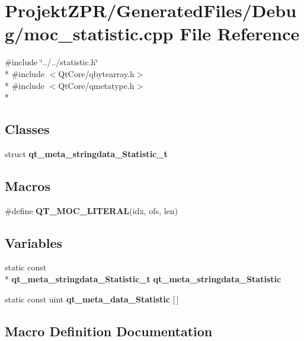 \section{Projekt\-Z\-P\-R/\-Generated\-Files/\-Debug/moc\-\_\-statistic.cpp File Reference}
\label{_debug_2moc__statistic_8cpp}
{\ttfamily \#include \char`\"{}../../statistic.\-h\char`\"{}}\\*
{\ttfamily \#include $<$Qt\-Core/qbytearray.\-h$>$}\\*
{\ttfamily \#include $<$Qt\-Core/qmetatype.\-h$>$}\\*
\subsection*{Classes}
\begin{DoxyCompactItemize}
\item 
struct {\bf qt\-\_\-meta\-\_\-stringdata\-\_\-\-Statistic\-\_\-t}
\end{DoxyCompactItemize}
\subsection*{Macros}
\begin{DoxyCompactItemize}
\item 
\#define {\bf Q\-T\-\_\-\-M\-O\-C\-\_\-\-L\-I\-T\-E\-R\-A\-L}(idx, ofs, len)
\end{DoxyCompactItemize}
\subsection*{Variables}
\begin{DoxyCompactItemize}
\item 
static const \\*
{\bf qt\-\_\-meta\-\_\-stringdata\-\_\-\-Statistic\-\_\-t} {\bf qt\-\_\-meta\-\_\-stringdata\-\_\-\-Statistic}
\item 
static const uint {\bf qt\-\_\-meta\-\_\-data\-\_\-\-Statistic} [$\,$]
\end{DoxyCompactItemize}


\subsection{Macro Definition Documentation}

